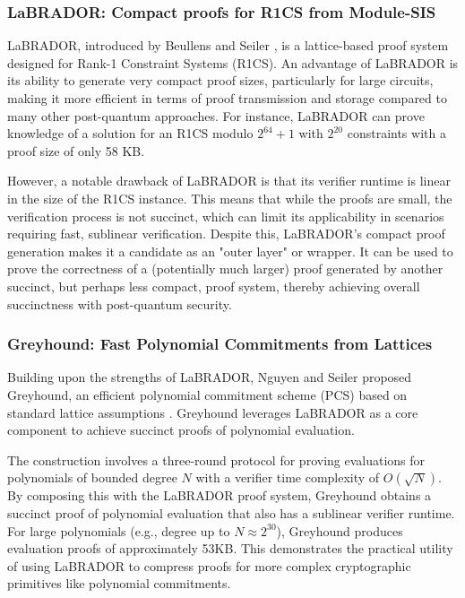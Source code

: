 \subsubsection{LaBRADOR: Compact proofs for R1CS from Module-SIS}

LaBRADOR, introduced by Beullens and Seiler \cite{LaBRADOR}, is a lattice-based
proof system designed for Rank-1 Constraint Systems (R1CS). An advantage of
LaBRADOR is its ability to generate very compact proof sizes, particularly for
large circuits, making it more efficient in terms of proof transmission and
storage compared to many other post-quantum approaches. For instance, LaBRADOR
can prove knowledge of a solution for an R1CS modulo $2^{64} + 1$ with
$2^{20}$ constraints with a proof size of only 58 KB.

However, a notable drawback of LaBRADOR is that its verifier runtime is linear
in the size of the R1CS instance. This means that while the proofs are small,
the verification process is not succinct, which can limit its applicability in
scenarios requiring fast, sublinear verification. Despite this, LaBRADOR's
compact proof generation makes it a candidate as an "outer layer" or wrapper.
It can be used to prove the correctness of a (potentially much larger) proof
generated by another succinct, but perhaps less compact, proof system, thereby
achieving overall succinctness with post-quantum security.

\subsubsection{Greyhound: Fast Polynomial Commitments from Lattices}

Building upon the strengths of LaBRADOR, Nguyen and Seiler proposed Greyhound,
an efficient polynomial commitment scheme (PCS) based on standard
lattice assumptions \cite{Greyhound}. Greyhound leverages LaBRADOR as a core
component to achieve succinct proofs of polynomial evaluation.

The construction involves a three-round protocol for proving evaluations for
polynomials of bounded degree $N$ with a verifier time complexity of
$O(\sqrt{N})$. By composing this with the LaBRADOR proof system, Greyhound
obtains a succinct proof of polynomial evaluation that also has a sublinear
verifier runtime. For large polynomials (e.g., degree up to $N \approx
	2^{30}$), Greyhound produces evaluation proofs of approximately 53KB. This
demonstrates the practical utility of using LaBRADOR to compress proofs for
more complex cryptographic primitives like polynomial commitments.

